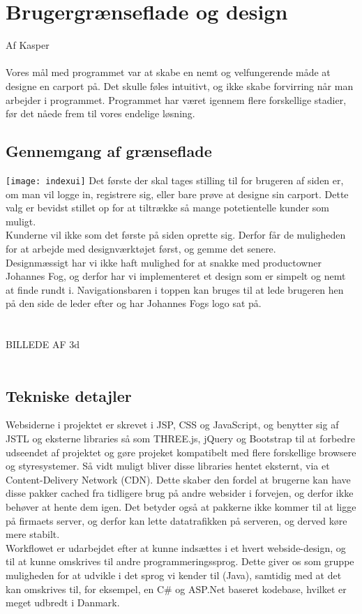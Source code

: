 \section{Brugergrænseflade og design}
Af Kasper\\\\
Vores mål med programmet var at skabe en nemt og velfungerende måde at designe en carport på.
Det skulle føles intuitivt, og ikke skabe forvirring når man arbejder i programmet.
Programmet har været igennem flere forskellige stadier, før det nåede frem til vores endelige løsning.
\\
\subsection{Gennemgang af grænseflade}
\texttt{[image: indexui]}
Det første der skal tages stilling til for brugeren af siden er, om man vil logge in, registrere sig, eller bare prøve at designe sin carport.
Dette valg er bevidst stillet op for at tiltrække så mange potetientelle kunder som muligt.\\
Kunderne vil ikke som det første på siden oprette sig. Derfor får de muligheden for at arbejde med designværktøjet først, og gemme det senere.\\
Designmæssigt har vi ikke haft mulighed for at snakke med productowner Johannes Fog, og derfor har vi implementeret et design som er simpelt og nemt at finde rundt i.
Navigationsbaren i toppen kan bruges til at lede brugeren hen på den side de leder efter og har Johannes Fogs logo sat på.\\
\\\\
BILLEDE AF 3d
\\\\


\subsection{Tekniske detajler}
Websiderne i projektet er skrevet i JSP, CSS og JavaScript, og benytter sig af JSTL og eksterne libraries så som THREE.js, jQuery og Bootstrap til at forbedre udseendet af projektet og gøre projeket kompatibelt med flere forskellige browsere og styresystemer. Så vidt muligt bliver disse libraries hentet eksternt, via et Content-Delivery Network (CDN). Dette skaber den fordel at brugerne kan have disse pakker cached fra tidligere brug på andre websider i forvejen, og derfor ikke behøver at hente dem igen. Det betyder også at pakkerne ikke kommer til at ligge på firmaets server, og derfor kan lette datatrafikken på serveren, og derved køre mere stabilt.
\\Workflowet er udarbejdet efter at kunne indsættes i et hvert webside-design, og til at kunne omskrives til andre programmeringssprog. 
Dette giver os som gruppe muligheden for at udvikle i det sprog vi kender til (Java), samtidig med at det kan omskrives til, for eksempel, en C\# og ASP.Net baseret kodebase, hvilket er meget udbredt i Danmark.
